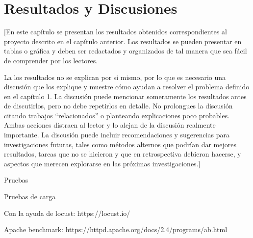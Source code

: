 \chapter{Resultados y Discusiones}
[En este capítulo se presentan los resultados obtenidos correspondientes al proyecto descrito en el capítulo anterior. Los resultados se pueden presentar en tablas o gráfica y deben ser redactados y organizados de tal manera que sea fácil de comprender por los lectores.

La los resultados no se explican por si mismo, por lo que es necesario una discusión que los explique y muestre cómo ayudan a resolver el problema definido en el capítulo 1. La discusión puede mencionar someramente los resultados antes de discutirlos, pero no debe repetirlos en detalle. No prolongues la discusión citando trabajos ``relacionados'' o planteando explicaciones poco probables. Ambas acciones distraen al lector y lo alejan de la discusión realmente importante. La discusión puede incluir recomendaciones y sugerencias para investigaciones futuras, tales como métodos alternos que podrían dar mejores resultados, tareas que no se hicieron y que en retrospectiva debieron hacerse, y aspectos que merecen explorarse en las próximas investigaciones.]

Pruebas

Pruebas de carga


Con la ayuda de locust: https://locust.io/

Apache benchmark: https://httpd.apache.org/docs/2.4/programs/ab.html
